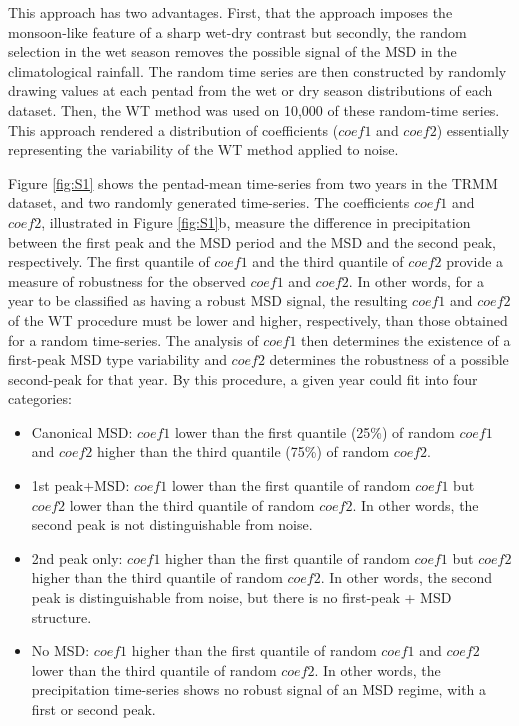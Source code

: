  
 This approach has two advantages. First, that the approach imposes the monsoon-like feature of a sharp wet-dry contrast but secondly, the random selection in the wet season removes the possible signal of the MSD in the climatological rainfall.
 The random time series are then constructed by randomly drawing values at each pentad  from the wet or dry season distributions of each dataset.
 Then, the WT method was used on 10,000 of these random-time series. This approach rendered a distribution of coefficients ($coef1$ and $coef2$) essentially representing the variability of the WT method applied to noise.
 
  Figure \ref{fig:S1} shows the pentad-mean time-series from two years in the TRMM dataset, and two randomly generated time-series.
The coefficients $coef1$ and $coef2$, illustrated in Figure \ref{fig:S1}b, measure the difference in precipitation between the first peak and the MSD period and the MSD and the second peak, respectively. The first quantile of $coef1$ and the third quantile of $coef2$ provide a measure of robustness for the observed $coef1$ and $coef2$. In other words, for a year to be classified as having a robust MSD signal, the resulting $coef1$ and $coef2$ of the WT procedure must be lower and higher, respectively, than those obtained for a random time-series.
The analysis of $coef1$ then determines the existence of a first-peak MSD type variability and $coef2$ determines the robustness of a possible second-peak for that year.
By this procedure, a given year could fit into four categories:

\begin{itemize}
\item Canonical MSD: $coef1$ lower than the first quantile (25\%) of random $coef1$ and $coef2$ higher than the third quantile (75\%) of random $coef2$.
\item 1st peak+MSD: $coef1$ lower than the first quantile of random $coef1$ but $coef2$ lower than the third quantile of random $coef2$. In other words, the second peak is not distinguishable from noise.
\item 2nd peak only: $coef1$ higher than the first quantile of random $coef1$ but $coef2$ higher than the third quantile of random $coef2$. In other words, the second peak is distinguishable from noise, but there is no first-peak + MSD structure.
\item No MSD: $coef1$ higher than the first quantile of random $coef1$ and $coef2$ lower than the third quantile of random $coef2$. In other words, the precipitation time-series shows no robust signal of an MSD regime, with a first or second peak.
\end{itemize}
 
